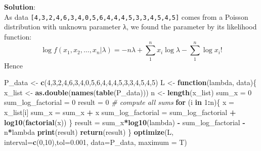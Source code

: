 \documentclass[]{article}
\newenvironment{Shaded}{\begin{snugshade}}{\end{snugshade}}
\newcommand{\KeywordTok}[1]{\textcolor[rgb]{0.13,0.29,0.53}{\textbf{#1}}}
\newcommand{\DataTypeTok}[1]{\textcolor[rgb]{0.13,0.29,0.53}{#1}}
\newcommand{\DecValTok}[1]{\textcolor[rgb]{0.00,0.00,0.81}{#1}}
\newcommand{\FloatTok}[1]{\textcolor[rgb]{0.00,0.00,0.81}{#1}}
\newcommand{\StringTok}[1]{\textcolor[rgb]{0.31,0.60,0.02}{#1}}
\newcommand{\CommentTok}[1]{\textcolor[rgb]{0.56,0.35,0.01}{\textit{#1}}}
\newcommand{\ControlFlowTok}[1]{\textcolor[rgb]{0.13,0.29,0.53}{\textbf{#1}}}
\newcommand{\OperatorTok}[1]{\textcolor[rgb]{0.81,0.36,0.00}{\textbf{#1}}}
\newcommand{\NormalTok}[1]{#1}
\begin{document}
\textbf{Solution}:\\
As data \texttt{{[}4,3,2,4,6,3,4,0,5,6,4,4,4,5,3,3,4,5,4,5{]}} comes
from a Poisson distribution with unknown parameter λ, we found the
parameter by its likelihood function:
\[\log { f({ x }_{ 1 },{ x }_{ 2 },\dots ,{ x }_{ n }|\lambda ) } =-n\lambda +\sum _{ 1 }^{ n }{ { x }_{ i }\log { \lambda  }  } -\sum _{ 1 }^{ n }{ \log { { x }_{ i }! }  } \]
Hence

\begin{Shaded}
\begin{Highlighting}[]
\NormalTok{P_data <-}\StringTok{ }\KeywordTok{c}\NormalTok{(}\DecValTok{4}\NormalTok{,}\DecValTok{3}\NormalTok{,}\DecValTok{2}\NormalTok{,}\DecValTok{4}\NormalTok{,}\DecValTok{6}\NormalTok{,}\DecValTok{3}\NormalTok{,}\DecValTok{4}\NormalTok{,}\DecValTok{0}\NormalTok{,}\DecValTok{5}\NormalTok{,}\DecValTok{6}\NormalTok{,}\DecValTok{4}\NormalTok{,}\DecValTok{4}\NormalTok{,}\DecValTok{4}\NormalTok{,}\DecValTok{5}\NormalTok{,}\DecValTok{3}\NormalTok{,}\DecValTok{3}\NormalTok{,}\DecValTok{4}\NormalTok{,}\DecValTok{5}\NormalTok{,}\DecValTok{4}\NormalTok{,}\DecValTok{5}\NormalTok{)}
\NormalTok{L <-}\StringTok{ }\ControlFlowTok{function}\NormalTok{(lambda, data)\{}
\NormalTok{    x_list <-}\StringTok{ }\KeywordTok{as.double}\NormalTok{(}\KeywordTok{names}\NormalTok{(}\KeywordTok{table}\NormalTok{(P_data)))}
\NormalTok{    n <-}\StringTok{ }\KeywordTok{length}\NormalTok{(x_list)}
\NormalTok{    sum_x =}\StringTok{ }\DecValTok{0}
\NormalTok{    sum_log_factorial =}\StringTok{ }\DecValTok{0}
\NormalTok{    result =}\StringTok{ }\DecValTok{0}
    \CommentTok{# compute all sums}
    \ControlFlowTok{for}\NormalTok{ (i }\ControlFlowTok{in} \DecValTok{1}\OperatorTok{:}\NormalTok{n)\{}
\NormalTok{        x =}\StringTok{ }\NormalTok{x_list[i]}
\NormalTok{        sum_x =}\StringTok{ }\NormalTok{sum_x }\OperatorTok{+}\StringTok{ }\NormalTok{x}
\NormalTok{        sum_log_factorial =}\StringTok{ }\NormalTok{sum_log_factorial }\OperatorTok{+}\StringTok{ }\KeywordTok{log10}\NormalTok{(}\KeywordTok{factorial}\NormalTok{(x))}
\NormalTok{    \}}
\NormalTok{    result =}\StringTok{ }\NormalTok{sum_x}\OperatorTok{*}\KeywordTok{log10}\NormalTok{(lambda) }\OperatorTok{-}\StringTok{ }\NormalTok{sum_log_factorial }\OperatorTok{-}\StringTok{ }\NormalTok{n}\OperatorTok{*}\NormalTok{lambda}
    \KeywordTok{print}\NormalTok{(result)}
    \KeywordTok{return}\NormalTok{(result)}
\NormalTok{\}}
\KeywordTok{optimize}\NormalTok{(L, }\DataTypeTok{interval=}\KeywordTok{c}\NormalTok{(}\DecValTok{0}\NormalTok{,}\DecValTok{10}\NormalTok{),}\DataTypeTok{tol=}\FloatTok{0.001}\NormalTok{, }\DataTypeTok{data=}\NormalTok{P_data, }\DataTypeTok{maximum =}\NormalTok{ T)}
\end{Highlighting}
\end{Shaded}
\end{document}
